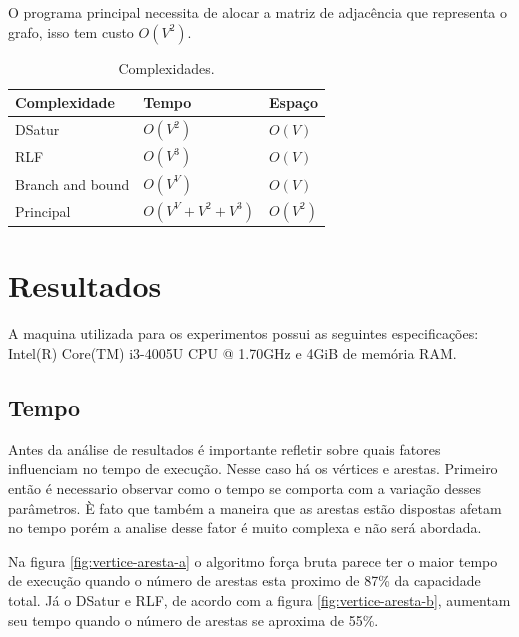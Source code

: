 \documentclass[12pt]{article}
\begin{document}
O programa principal necessita de alocar a matriz de adjacência que representa o grafo, isso tem custo \(O(V^2)\).
\begin{table}[htbp]
\centering
\begin{tabular}{lll}
\hline
Complexidade & Tempo & Espaço\\
\hline
DSatur & \(O(V^2)\) & \(O(V)\)\\
RLF & \(O(V^3)\) & \(O(V)\)\\
Branch and bound & \(O(V^V)\) & \(O(V)\)\\
Principal & \(O(V^V + V^2 + V^3)\) & \(O(V^2)\)\\
\hline
\end{tabular}
\caption{\label{tab:org541b157}
Complexidades.}

\end{table}


\section{Resultados}
\label{sec:orgf04e3b4}

A maquina utilizada para os experimentos possui as seguintes especificações: Intel(R) Core(TM) i3-4005U CPU @ 1.70GHz e 4GiB de memória RAM.

\subsection{Tempo}
\label{sec:org90c8c34}
Antes da análise de resultados é importante refletir sobre quais fatores influenciam no tempo de execução. Nesse caso há os vértices e arestas. Primeiro então é necessario observar como o tempo se comporta com a variação desses parâmetros. È fato que também a maneira que as arestas estão dispostas afetam no tempo porém a analise desse fator é muito complexa e não será abordada.

Na figura \ref{fig:vertice-aresta-a} o algoritmo força bruta parece ter o maior tempo de execução quando o número de arestas esta proximo de 87\% da capacidade total. Já o DSatur e RLF, de acordo com a figura \ref{fig:vertice-aresta-b}, aumentam seu tempo quando o número de arestas se aproxima de 55\%.
\end{document}
